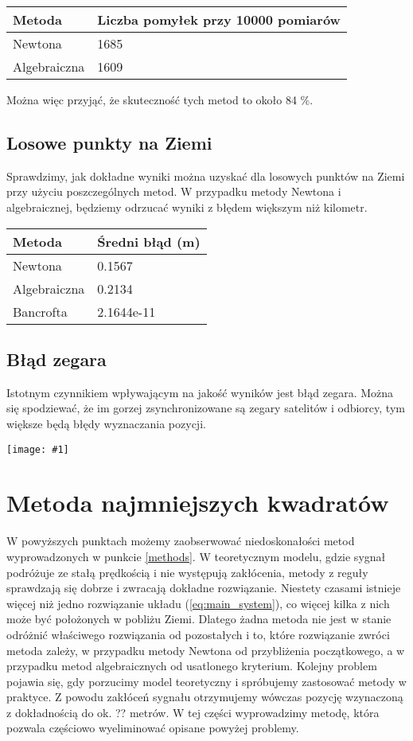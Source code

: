 \documentclass{article}
\newcommand{\plot}[1] {
	\texttt{[image: \#1]}
}
\begin{document}
\begin{tabular}{ |p{4cm}|p{6cm}|  }
 \hline
 	Metoda  & Liczba pomyłek przy 10000 pomiarów\\
 \hline 
  	Newtona & 1685 \\
 \hline 
 	Algebraiczna & 1609 \\
 \hline
\end{tabular}

	 Można więc przyjąć, że skuteczność tych metod to około 84 \%.
	
\subsection{Losowe punkty na Ziemi}
	Sprawdzimy, jak dokładne wyniki można uzyskać dla losowych punktów na Ziemi przy użyciu poszczególnych metod. W przypadku metody Newtona i algebraicznej, będziemy odrzucać wyniki z błędem większym niż kilometr.
	
	\begin{tabular}{ |p{4cm}|p{6cm}|  }
 \hline
 	Metoda  & Średni błąd (m) \\
 \hline 
  	Newtona & 0.1567 \\
 \hline 
 	Algebraiczna & 0.2134 \\
 \hline
 	Bancrofta & 2.1644e-11\\
 \hline
\end{tabular}
	
	
\subsection{ Błąd zegara }
Istotnym czynnikiem wpływającym na jakość wyników jest błąd zegara. Można się spodziewać, że im gorzej zsynchronizowane są zegary satelitów i odbiorcy, tym większe będą błędy wyznaczania pozycji.

\plot{zegar.png}


\section{Metoda najmniejszych kwadratów}
W powyższych punktach możemy zaobserwować niedoskonałości metod wyprowadzonych w punkcie \ref{methods}.
W teoretycznym modelu, gdzie sygnał podróżuje ze stałą prędkością i nie występują zakłócenia, metody z reguły
sprawdzają się dobrze i zwracają dokładne rozwiązanie. Niestety czasami istnieje więcej niż jedno rozwiązanie układu
(\ref{eq:main_system}), co więcej kilka z nich może być położonych w pobliżu Ziemi. Dlatego żadna metoda nie jest w stanie
odróżnić właściwego rozwiązania od pozostałych i to, które rozwiązanie zwróci metoda zależy, w przypadku metody
Newtona od przybliżenia początkowego, a w przypadku metod algebraicznych od usatlonego kryterium.
Kolejny problem pojawia się, gdy porzucimy model teoretyczny i spróbujemy zastosować metody w praktyce.
Z powodu zakłóceń sygnału otrzymujemy wówczas pozycję wzynaczoną z dokładnością do ok. ?? metrów.
W tej części wyprowadzimy metodę, która pozwala częściowo wyeliminować opisane powyżej problemy.
\end{document}
